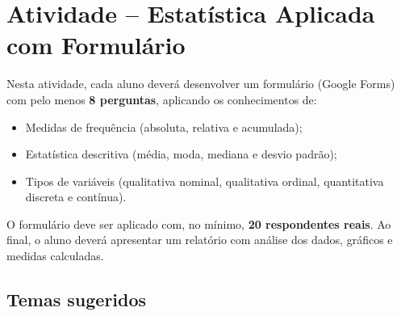 \documentclass[12pt,a4paper]{article}
\begin{document}
\newpage
\hfill
\vspace{1cm}
\section*{Atividade – Estatística Aplicada com Formulário}

Nesta atividade, cada aluno deverá desenvolver um formulário (Google Forms) com pelo menos \textbf{8 perguntas}, aplicando os conhecimentos de:

\begin{itemize}
    \item Medidas de frequência (absoluta, relativa e acumulada);
    \item Estatística descritiva (média, moda, mediana e desvio padrão);
    \item Tipos de variáveis (qualitativa nominal, qualitativa ordinal, quantitativa discreta e contínua).
\end{itemize}

O formulário deve ser aplicado com, no mínimo, \textbf{20 respondentes reais}. Ao final, o aluno deverá apresentar um relatório com análise dos dados, gráficos e medidas calculadas.

\subsection*{Temas sugeridos}
\end{document}
